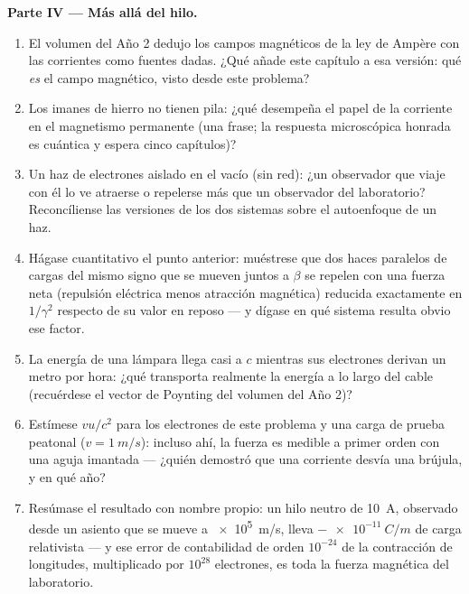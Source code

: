 \begin{problem}
\medskip\noindent\textbf{Parte IV --- Más allá del hilo.}
\begin{enumerate}[resume]
  \item El volumen del Año 2 dedujo los campos magnéticos de la ley de
        Ampère con las corrientes como fuentes dadas. ¿Qué añade este
        capítulo a esa versión: qué \emph{es} el campo magnético, visto
        desde este problema?
  \item Los imanes de hierro no tienen pila: ¿qué desempeña el papel de
        la corriente en el magnetismo permanente (una frase; la
        respuesta microscópica honrada es cuántica y espera cinco
        capítulos)?
  \item Un haz de electrones aislado en el vacío (sin red): ¿un
        observador que viaje con él lo ve atraerse o repelerse más que un
        observador del laboratorio? Reconcíliense las versiones de los dos
        sistemas sobre el autoenfoque de un haz.
  \item Hágase cuantitativo el punto anterior: muéstrese que dos haces
        paralelos de cargas del mismo signo que se mueven juntos a
        $\beta$ se repelen con una fuerza neta (repulsión eléctrica
        menos atracción magnética) reducida exactamente en $1/\gamma^2$
        respecto de su valor en reposo --- y dígase en qué sistema resulta
        obvio ese factor.
  \item La energía de una lámpara llega casi a $c$ mientras sus
        electrones derivan un metro por hora: ¿qué transporta realmente
        la energía a lo largo del cable (recuérdese el vector de Poynting
        del volumen del Año 2)?
  \item Estímese $vu/c^2$ para los electrones de este problema y una carga
        de prueba peatonal ($v = \qty{1}{m/s}$): incluso ahí, la fuerza
        es medible a primer orden con una aguja imantada --- ¿quién
        demostró que una corriente desvía una brújula, y en qué año?
  \item Resúmase el resultado con nombre propio: un hilo neutro de
        \qty{10}{A}, observado desde un asiento que se mueve a
        \qty{e5}{m/s}, lleva $-\qty{e-11}{C/m}$ de carga relativista ---
        y ese error de contabilidad de orden $10^{-24}$ de la
        contracción de longitudes, multiplicado por $10^{28}$
        electrones, es toda la fuerza magnética del laboratorio.
\end{enumerate}
\end{problem}
